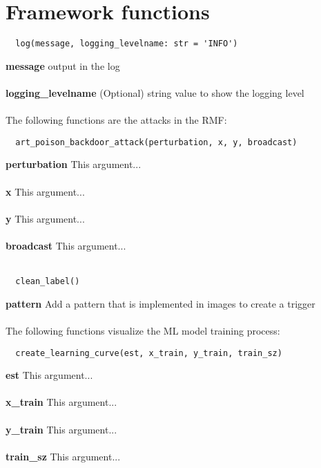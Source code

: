 \section{Framework functions}
\label{sec:frame_func}

\begin{lstlisting}
  log(message, logging_levelname: str = 'INFO')
\end{lstlisting}

\noindent\textbf{message}
output in the log \\ \\
\textbf{logging\_levelname}
(Optional) string value to show the logging level \\ \\

The following functions are the attacks in the RMF: \\

\begin{lstlisting}
  art_poison_backdoor_attack(perturbation, x, y, broadcast)
\end{lstlisting}

\noindent\textbf{perturbation}
This argument... \\ \\
\textbf{x}
This argument... \\ \\
\textbf{y}
This argument... \\ \\
\textbf{broadcast}
This argument... \\ \\

\begin{lstlisting}
  clean_label()
\end{lstlisting}

\noindent\textbf{pattern}
Add a pattern that is implemented in images to create a trigger \\ \\

The following functions visualize the ML model training process: \\

\begin{lstlisting}
  create_learning_curve(est, x_train, y_train, train_sz)
\end{lstlisting}

\noindent\textbf{est}
This argument... \\ \\
\textbf{x\_train}
This argument... \\ \\
\textbf{y\_train}
This argument... \\ \\
\textbf{train\_sz}
This argument... \\ \\

